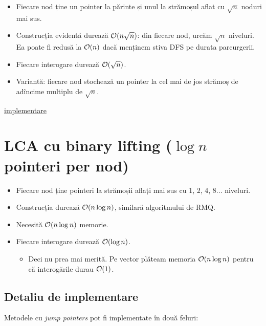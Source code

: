 \documentclass[../main.tex]{subfiles}
\begin{document}
\begin{itemize}
  \item Fiecare nod ține un pointer la părinte și unul la strămoșul aflat cu $\sqrt{n}$ noduri mai sus.

  \item Construcția evidentă durează $\mathcal{O}(n \sqrt{n})$: din fiecare nod, urcăm $\sqrt{n}$ niveluri. Ea poate fi redusă la $\mathcal{O}(n)$ dacă menținem stiva DFS pe durata parcurgerii.

  \item Fiecare interogare durează $\mathcal{O}(\sqrt{n})$.

  \item Variantă: fiecare nod stochează un pointer la cel mai de jos strămoș de adîncime multiplu de $\sqrt{n}$.
\end{itemize}

\label{problem:tree-lca-sqrt}
\hyperref[code:tree-lca-sqrt]{implementare}

\section{LCA cu binary lifting (\texorpdfstring{$\log n$}{log n} pointeri per nod)}

\begin{itemize}
  \item Fiecare nod ține pointeri la strămoșii aflați mai sus cu 1, 2, 4, 8... niveluri.

  \item Construcția durează $\mathcal{O}(n \log n)$, similară algoritmului de RMQ.

  \item Necesită $\mathcal{O}(n \log n)$ memorie.

  \item Fiecare interogare durează $\mathcal{O}(\log n)$.

  \begin{itemize}
    \item Deci nu prea mai merită. Pe vector plăteam memoria $\mathcal{O}(n \log n)$ pentru că interogările durau $\mathcal{O}(1)$.
  \end{itemize}
\end{itemize}

\subsection*{Detaliu de implementare}

Metodele cu \textit{jump pointers} pot fi implementate în două feluri:
\end{document}
